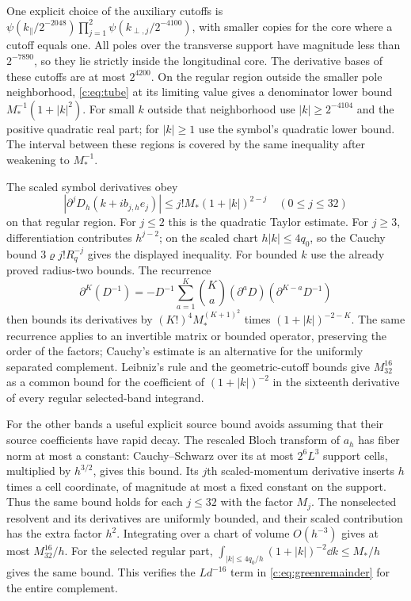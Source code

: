 One explicit choice of the auxiliary cutoffs is
$\psi(k_\parallel/2^{-2048})\prod_{j=1}^2\psi(k_{\perp,j}/2^{-4100})$,
with smaller copies for the core where a cutoff equals one.
All poles over the transverse support have magnitude less than
$2^{-7890}$, so they lie strictly inside the longitudinal core.
The derivative bases of these cutoffs are at most $2^{4200}$.
On the regular region outside the smaller pole neighborhood,
\eqref{c:eq:tube} at its limiting value gives a denominator lower
bound $M_*^{-1}(1+|k|^2)$. For small $k$ outside that neighborhood
use $|k|\ge2^{-4104}$ and the positive quadratic real part; for
$|k|\ge1$ use the symbol's quadratic lower bound. The interval
between these regions is covered by the same inequality after
weakening to $M_*^{-1}$.

The scaled symbol derivatives obey
\[
 |\partial^jD_h(k+ib_{j,h}e_j)|
 \le j!M_*(1+|k|)^{2-j}\quad(0\le j\le32)
\]
on that regular region. For $j\le2$ this is the quadratic Taylor
estimate. For $j\ge3$, differentiation contributes $h^{j-2}$;
on the scaled chart $h|k|\le4q_0$, so the Cauchy bound
$3\varrho j!R_q^{-j}$ gives the displayed inequality. For bounded
$k$ use the already proved radius-two bounds.
The recurrence
\[
 \partial^K(D^{-1})=-D^{-1}\sum_{a=1}^K
       \binom{K}{a}(\partial^aD)(\partial^{K-a}D^{-1})
\]
then bounds its derivatives by $(K!)^4M_*^{(K+1)^2}$ times
$(1+|k|)^{-2-K}$. The same recurrence applies to an invertible
matrix or bounded operator, preserving the order of the factors;
Cauchy's estimate is an alternative for the uniformly separated
complement. Leibniz's rule and the geometric-cutoff bounds give
$M_{32}^{16}$ as a common bound for the coefficient of
$(1+|k|)^{-2}$ in the sixteenth derivative of every regular
selected-band integrand.

For the other bands a useful explicit source bound avoids assuming
that their source coefficients have rapid decay. The rescaled Bloch
transform of $a_h$ has fiber norm at most a constant: Cauchy--Schwarz
over its at most $2^6L^3$ support cells, multiplied by $h^{3/2}$,
gives this bound. Its $j$th scaled-momentum derivative inserts
$h$ times a cell coordinate, of magnitude at most a fixed constant
on the support. Thus the same bound holds for each $j\le32$ with
the factor $M_j$. The nonselected resolvent and its derivatives
are uniformly bounded, and their scaled contribution has the
extra factor $h^2$. Integrating over a chart of volume $O(h^{-3})$
gives at most $M_{32}^{16}/h$. For the selected regular part,
$\int_{|k|\le4q_0/h}(1+|k|)^{-2}\dd k\le M_*/h$ gives the
same bound. This verifies the $L d^{-16}$ term in
\eqref{c:eq:greenremainder} for the entire complement.

